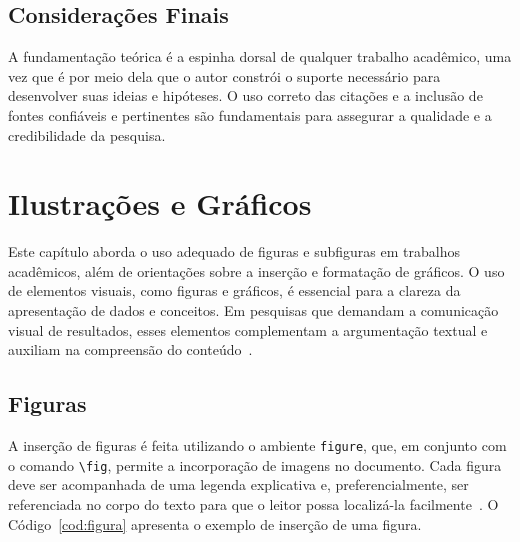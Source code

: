 \documentclass[
    12pt
    ,oneside
    ,a4paper
    ,chapter=TITLE
    ,section=TITLE
    ,sumario=abnt-6027-2012]{abntex2}
\begin{document}
\section{Considerações Finais}

A fundamentação teórica é a espinha dorsal de qualquer trabalho acadêmico, uma vez que é por meio dela que o autor constrói o suporte necessário para desenvolver suas ideias e hipóteses. O uso correto das citações e a inclusão de fontes confiáveis e pertinentes são fundamentais para assegurar a qualidade e a credibilidade da pesquisa.







\chapter{Ilustrações e Gráficos}
\label{cap:ilustracoes}

Este capítulo aborda o uso adequado de figuras e subfiguras em trabalhos acadêmicos, além de orientações sobre a inserção e formatação de gráficos. O uso de elementos visuais, como figuras e gráficos, é essencial para a clareza da apresentação de dados e conceitos. Em pesquisas que demandam a comunicação visual de resultados, esses elementos complementam a argumentação textual e auxiliam na compreensão do conteúdo~\cite{tufte1990envisioning}.

\section{Figuras}
\label{sec:figuras}

A inserção de figuras é feita utilizando o ambiente \texttt{figure}, que, em conjunto com o comando \texttt{\textbackslash fig}, permite a incorporação de imagens no documento. Cada figura deve ser acompanhada de uma legenda explicativa e, preferencialmente, ser referenciada no corpo do texto para que o leitor possa localizá-la facilmente~\cite{knuth1984texbook}. O Código~\ref{cod:figura} apresenta o exemplo de inserção de uma figura.
\end{document}
